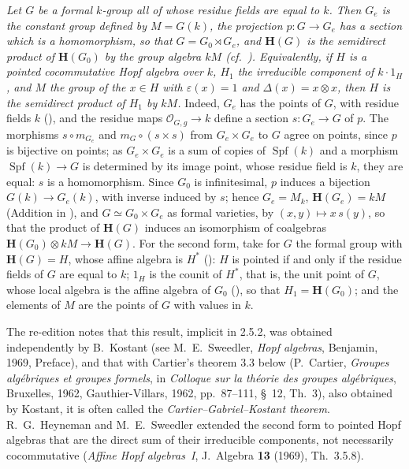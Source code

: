 \emph{Let \(G\) be a formal \(k\)-group all of whose residue fields are equal
to \(k\). Then \(G_e\) is the constant group defined by \(M=G(k)\), the
projection \(p\colon G\to G_e\) has a section which is a homomorphism, so
that \(G=G_0\rtimes G_e\), and \(\mathbf H(G)\) is the semidirect product of
\(\mathbf H(G_0)\) by the group algebra \(kM\)
\textup{(cf.\ )}. Equivalently, if \(H\) is a pointed cocommutative Hopf
algebra over \(k\), \(H_1\) the irreducible component of \(k\cdot1_H\), and \(M\)
the group of the \(x\in H\) with \(\varepsilon(x)=1\) and
\(\Delta(x)=x\otimes x\), then \(H\) is the semidirect product of \(H_1\) by
\(kM\).} Indeed, \(G_e\) has the points of \(G\), with residue fields \(k\)
\textup{()}, and the residue maps \(\mathcal O_{G,g}\to k\) define a section
\(s\colon G_e\to G\) of \(p\). The morphisms \(s\circ m_{G_e}\) and
\(m_G\circ(s\times s)\) from \(G_e\times G_e\) to \(G\) agree on points, since
\(p\) is bijective on points; as \(G_e\times G_e\) is a sum of copies of
\(\operatorname{Spf}(k)\) and a morphism \(\operatorname{Spf}(k)\to G\) is
determined by its image point, whose residue field is \(k\), they are equal:
\(s\) is a homomorphism. Since \(G_0\) is infinitesimal, \(p\) induces a
bijection \(G(k)\to G_e(k)\), with inverse induced by \(s\); hence
\(G_e=M_k\), \(\mathbf H(G_e)=kM\) (Addition in ), and
\(G\simeq G_0\times G_e\) as formal varieties, by \((x,y)\mapsto x\,s(y)\), so
that the product of \(\mathbf H(G)\) induces an isomorphism of coalgebras
\(\mathbf H(G_0)\otimes kM\to\mathbf H(G)\). For the second form, take for \(G\)
the formal group with \(\mathbf H(G)=H\), whose affine algebra is \(H^*\)
\textup{()}: \(H\) is pointed if and only if the residue fields of
\(G\) are equal to \(k\); \(1_H\) is the counit of \(H^*\), that is, the unit
point of \(G\), whose local algebra is the affine algebra of \(G_0\)
\textup{()}, so that \(H_1=\mathbf H(G_0)\); and the elements of \(M\) are the
points of \(G\) with values in \(k\).

The re-edition notes that this result, implicit in 2.5.2, was obtained
independently by B.~Kostant (see M.~E.~Sweedler, \emph{Hopf algebras},
Benjamin, 1969, Preface), and that with Cartier's theorem 3.3 below
(P.~Cartier, \emph{Groupes alg\'ebriques et groupes formels}, in
\emph{Colloque sur la th\'eorie des groupes alg\'ebriques}, Bruxelles,
1962, Gauthier-Villars, 1962, pp.~87--111, \S~12, Th.~3), also obtained by
Kostant, it is often called the \emph{Cartier--Gabriel--Kostant theorem}.
R.~G.~Heyneman and M.~E.~Sweedler extended the second form to pointed
Hopf algebras that are the direct sum of their irreducible components, not
necessarily cocommutative (\emph{Affine Hopf algebras~I}, J.~Algebra
\textbf{13} (1969), Th.~3.5.8).
